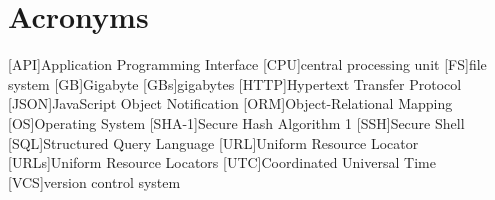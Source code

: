 \chapter*{Acronyms}
\begin{acronym}
    [API]{Application Programming Interface}
    [CPU]{central processing unit}
    [FS]{file system}
    [GB]{Gigabyte}
    [GBs]{gigabytes}
    [HTTP]{Hypertext Transfer Protocol}
    [JSON]{JavaScript Object Notification}
    [ORM]{Object-Relational Mapping}
    [OS]{Operating System}
    [SHA-1]{Secure Hash Algorithm 1}
    [SSH]{Secure Shell}
    [SQL]{Structured Query Language}
    [URL]{Uniform Resource Locator}
    [URLs]{Uniform Resource Locators}
    [UTC]{Coordinated Universal Time}
    [VCS]{version control system}
\end{acronym}
